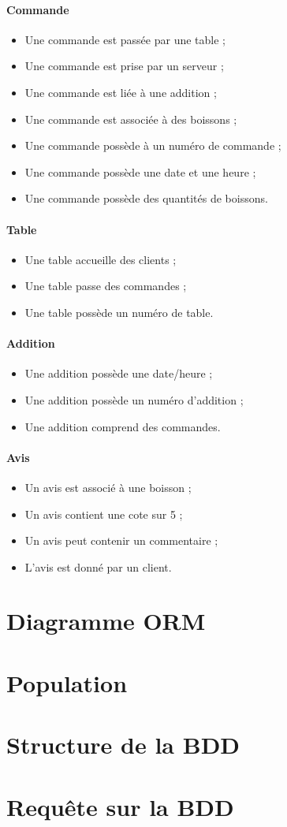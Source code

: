 \paragraph{Commande}
\begin{itemize}
	\item Une commande est passée par une table ;
	\item Une commande est prise par un serveur ;
	\item Une commande est liée à une addition ;
	\item Une commande est associée à des boissons ;
	\item Une commande possède à un numéro de commande ;
	\item Une commande possède une date et une heure ;
	\item Une commande possède des quantités de boissons.
\end{itemize}

\paragraph{Table}
\begin{itemize}
	\item Une table accueille des clients ;
	\item Une table passe des commandes ;
	\item Une table possède un numéro de table.
\end{itemize}

\paragraph{Addition}
\begin{itemize}
	\item Une addition possède une date/heure ;
	\item Une addition possède un numéro d’addition ;
	\item Une addition comprend des commandes.
\end{itemize}

\paragraph{Avis}
\begin{itemize}
	\item Un avis est associé à une boisson ;
	\item Un avis contient une cote sur 5 ;
	\item Un avis peut contenir un commentaire ;
	\item L'avis est donné par un client.
\end{itemize}

\section{Diagramme ORM}
\section{Population}
\section{Structure de la BDD}
\section{Requête sur la BDD}
